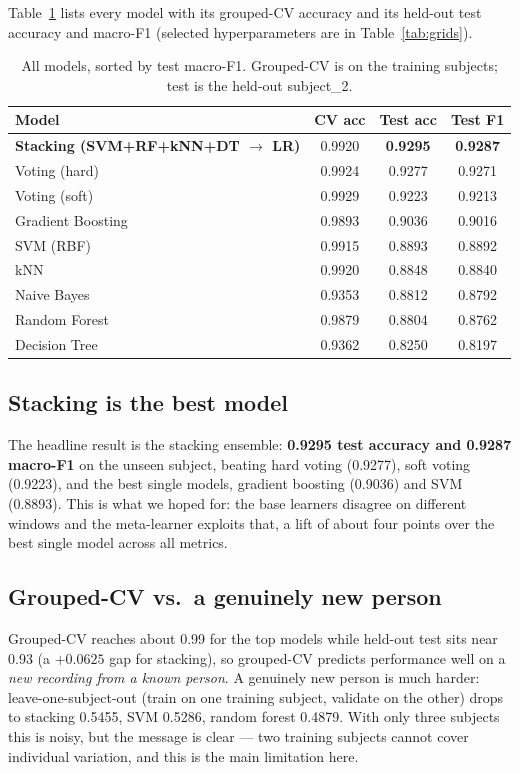 \documentclass[runningheads]{llncs}
\begin{document}
Table~\ref{tab:results} lists every model with its grouped-CV accuracy and its held-out test accuracy and macro-F1 (selected hyperparameters are in Table~\ref{tab:grids}).

\begin{table}[ht]
\caption{All models, sorted by test macro-F1. Grouped-CV is on the training subjects; test is the held-out subject\_2.}
\label{tab:results}
\centering\small
\begin{tabular}{lccc}
\toprule
\textbf{Model} & \textbf{CV acc} & \textbf{Test acc} & \textbf{Test F1} \\
\midrule
\textbf{Stacking (SVM+RF+kNN+DT $\to$ LR)} & 0.9920 & \textbf{0.9295} & \textbf{0.9287} \\
Voting (hard) & 0.9924 & 0.9277 & 0.9271 \\
Voting (soft) & 0.9929 & 0.9223 & 0.9213 \\
Gradient Boosting & 0.9893 & 0.9036 & 0.9016 \\
SVM (RBF) & 0.9915 & 0.8893 & 0.8892 \\
kNN & 0.9920 & 0.8848 & 0.8840 \\
Naive Bayes & 0.9353 & 0.8812 & 0.8792 \\
Random Forest & 0.9879 & 0.8804 & 0.8762 \\
Decision Tree & 0.9362 & 0.8250 & 0.8197 \\
\bottomrule
\end{tabular}
\end{table}

\subsection{Stacking is the best model}
The headline result is the stacking ensemble: \textbf{0.9295 test accuracy and 0.9287 macro-F1} on the unseen subject, beating hard voting (0.9277), soft voting (0.9223), and the best single models, gradient boosting (0.9036) and SVM (0.8893). This is what we hoped for: the base learners disagree on different windows and the meta-learner exploits that, a lift of about four points over the best single model across all metrics.

\subsection{Grouped-CV vs.\ a genuinely new person}
\label{sec:honesty}
Grouped-CV reaches about 0.99 for the top models while held-out test sits near 0.93 (a $+0.0625$ gap for stacking), so grouped-CV predicts performance well on a \emph{new recording from a known person}. A genuinely new person is much harder: leave-one-subject-out (train on one training subject, validate on the other) drops to stacking 0.5455, SVM 0.5286, random forest 0.4879. With only three subjects this is noisy, but the message is clear --- two training subjects cannot cover individual variation, and this is the main limitation here.
\end{document}
